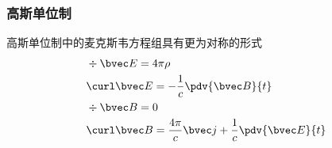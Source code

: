 \subsubsection{高斯单位制}
高斯单位制中的麦克斯韦方程组具有更为对称的形式
\begin{align}
&\div \bvec E = 4\pi\rho\\
&\curl \bvec E = -\frac{1}{c}\pdv{\bvec B}{t}\\
&\div \bvec B = 0 \\
&\curl \bvec B = \frac{4\pi}{c} \bvec j + \frac{1}{c}\pdv{\bvec E}{t}
\end{align}









